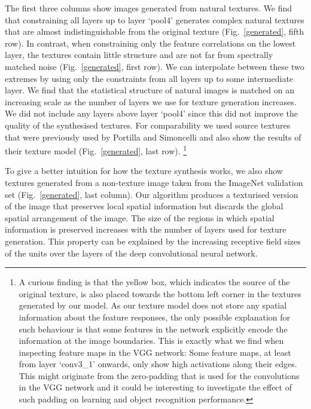 \documentclass{article} %
\begin{document}
The first three columns show images generated from natural textures. We find that constraining all layers up to layer `pool4' generates complex natural textures that are almost indistinguishable from the original texture (Fig.~\ref{generated}, fifth row). In contrast, when constraining only the feature correlations on the lowest layer, the textures contain little structure and are not far from spectrally matched noise (Fig.~\ref{generated}, first row). We can interpolate between these two extremes by using only the constraints from all layers up to some intermediate layer. We find that the statistical structure of natural images is matched on an increasing scale as the number of layers we use for texture generation increases. We did not include any layers above layer `pool4' since this did not improve the quality of the synthesised textures. For comparability we used source textures that were previously used by Portilla and Simoncelli \cite{portilla_parametric_2000} and also show the results of their texture model (Fig.~\ref{generated}, last row). \footnote{A curious finding is that the yellow box, which indicates the source of the original texture, is also placed towards the bottom left corner in the textures generated by our model. As our texture model does not store any spatial information about the feature responses, the only possible explanation for such behaviour is that some features in the network explicitly encode the information at the image boundaries. This is exactly what we find when inspecting feature maps in the VGG network: Some feature maps, at least from layer `conv3\_1' onwards, only show high activations along their edges. This might originate from the zero-padding that is used for the convolutions in the VGG network and it could be interesting to investigate the effect of such padding on learning and object recognition performance.}

To give a better intuition for how the texture synthesis works, we also show textures generated from a non-texture image taken from the ImageNet validation set \cite{russakovsky_imagenet_2014} (Fig.~\ref{generated}, last column). Our algorithm produces a texturised version of the image that preserves local spatial information but discards the global spatial arrangement of the image. The size of the regions in which spatial information is preserved increases with the number of layers used for texture generation. This property can be explained by the increasing receptive field sizes of the units over the layers of the deep convolutional neural network.  
\end{document}

